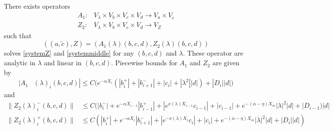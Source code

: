 \documentclass[thesis.tex]{subfiles}
\begin{document}
\begin{lemma}\label{Zinv1}
There exists operators
\begin{align*}
A_1: &V_\lambda \times V_b \times V_c \times V_d \rightarrow V_a \times V_{\tilde{c}} \\
Z_2: &V_\lambda \times V_b \times V_c \times V_d \rightarrow V_Z
\end{align*}
such that 
\[
((a, \tilde{c}), Z) = (A_1(\lambda)(b, c, d), Z_2(\lambda)(b,c,d))
\]
solves \eqref{systemZ} and \eqref{systemmiddle} for any $(b, c, d)$ and $\lambda$. These operator are analytic in $\lambda$ and linear in $(b, c, d)$. Piecewise bounds for $A_1$ and $Z_2$ are given by
\begin{align}\label{A1bound}
|A_1&(\lambda)_i(b, c, d)|
\leq C \Big( e^{-\alpha X_i} (|b_i^+| + |b_{i+1}^-| + |c_i| + |\lambda^2||d|) + |D_i||d| \Big)
\end{align} 
and
\begin{equation}\label{Z2bound}
\begin{aligned}
\| Z_2(\lambda)_i^-(b,c,d) \| &\leq C(|b_i^-| + e^{-\alpha X_{i-1}}|b_{i-1}^+| + |e^{\nu(\lambda)X_{i-1}}c_{i-1}| + |c_{i-1}| + e^{-(\alpha - \eta) X_m}|\lambda|^2|d| + |D_{i-1})|d| \\
\| Z_2(\lambda)_i^+(b,c,d) \| &\leq C(|b_i^+| + e^{-\alpha X_i}|b_{i+1}^-| + |e^{-\nu(\lambda)X_i} c_i| + |c_i| + e^{-(\alpha - \eta) X_m}|\lambda|^2|d| + |D_i||d|)
\end{aligned}
\end{equation}


\end{lemma}
\end{document}
